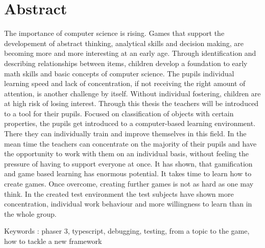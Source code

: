 
\chapter*{Abstract}
The importance of computer science is rising. Games that support the developement of abstract thinking,
analytical skills and decision making, are becoming more and more interesting at an early age.
Through identification and describing relationships between items, children develop a foundation to early
math skills and basic concepts of computer science.
The pupils individual learning speed and lack of concentration, if not receiving the right amount of attention,
is another challenge by itself.
Without individual fostering, children are at high risk of losing interest.
Through this thesis the teachers will be introduced to a tool for their pupils.
Focused on classification of objects with certain properties,
the pupils get introduced to a computer-based learning environment.
There they can individually train and improve themselves in this field.
In the mean time the teachers can concentrate on the majority of their pupils and have the opportunity to work with
them on an individual basis, without feeling the pressure of having to support everyone at once.
It has shown, that gamification and game based learning has enormous potential.
It takes time to learn how to create games. Once overcome, creating further games is not as hard as one may think.
In the created test environment the test subjects have shown more concentration,
individual work behaviour and more willingness to learn than in the whole group.

Keywords : phaser 3, typescript, debugging, testing, from a topic to the game, how to tackle a new framework

